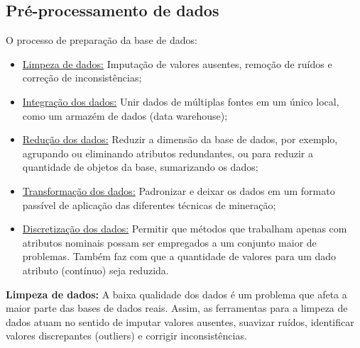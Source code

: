 \subsection{Pré-processamento de dados}

O processo de preparação da base de dados:

\begin{itemize}
	\item \underline{Limpeza de dados:}
		Imputação de valores ausentes, remoção de ruídos e correção de inconsistências;
	\item \underline{Integração dos dados:}
		Unir dados de múltiplas fontes em um único local, como um armazém de dados (data warehouse);
	\item \underline{Redução dos dados:}
		Reduzir a dimensão da base de dados, por exemplo, agrupando ou eliminando atributos redundantes, ou para reduzir a quantidade de objetos da base, sumarizando os dados;
	\item \underline{Transformação dos dados:}
		Padronizar e deixar os dados em um formato passível de aplicação das diferentes técnicas de mineração;
	\item \underline{ Discretização dos dados:}
		Permitir que métodos que trabalham apenas com atributos nominais possam ser empregados a um conjunto maior de problemas.
		Também faz com que a quantidade de valores para um dado atributo (contínuo) seja reduzida.
\end{itemize}


\textbf{Limpeza de dados:}
A baixa qualidade dos dados é um problema que afeta a maior parte das bases de dados reais.
Assim, as ferramentas para a limpeza de dados atuam no sentido de imputar valores ausentes, suavizar ruídos, identificar valores discrepantes (outliers) e corrigir inconsistências.


